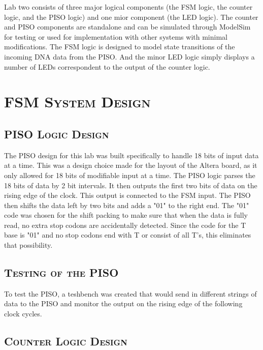 \documentclass[11pt]{report}
\begin{document}
\begin{spacing}{1.5}
Lab two consists of three major logical components (the FSM logic, the counter logic, and the PISO logic) and one mior component (the LED logic).  The counter and PISO components are standalone and can be simulated through ModelSim for testing or used for implementation with other systems with minimal modifications.  The FSM logic is designed to model state transitions of the incoming DNA data from the PISO.  And the minor LED logic simply displays a number of LEDs correspondent to the output of the counter logic.

\section{\scshape FSM System Design} %
\label{sec:fsm_design}

\subsection{\scshape PISO Logic Design}
\label{sub:design_piso}

The PISO design for this lab was built specifically to handle 18 bits of input data at a time.  This was a design choice made for the layout of the Altera board, as it only allowed for 18 bits of modifiable input at a time. The PISO logic parses the 18 bits of data by 2 bit intervals.  It then outputs the first two bits of data on the rising edge of the clock.  This output is connected to the FSM input.  The PISO then shifts the data left by two bits and adds a "01" to the right end.  The "01" code was chosen for the shift packing to make sure that when the data is fully read, no extra stop codons are accidentally detected.  Since the code for the T base is "01" and no stop codons end with T or consist of all T's, this eliminates that possibility.

\subsection{\scshape Testing of the PISO}
\label{sub:test_piso}

To test the PISO, a teshbench was created that would send in different strings of data to the PISO and monitor the output on the rising edge of the following clock cycles.

\subsection{\scshape Counter Logic Design}
\label{sub:design_counter}


\end{spacing}
\end{document}
